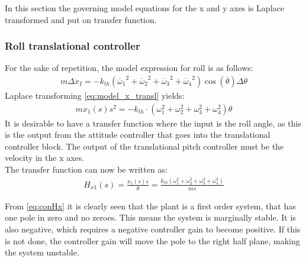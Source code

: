 In this section the governing model equations for the x and y axes is Laplace transformed and put on transfer function. 
\subsubsection*{Roll translational controller}
For the sake of repetition, the model expression for roll is as follows:
\begin{align}
m\Delta\ddot{x}_I = -k_{th}({\overline{\omega}_1}^2+{\overline{\omega}_2}^2+{\overline{\omega}_3}^2+{\overline{\omega}_4}^2)\cos(\overline{\theta})\Delta\theta
\label{eq:model_x_transl}
\end{align} 
Laplace transforming \autoref{eq:model_x_transl} yields:
\begin{align}
m x_1(s)s^2=-k_{th}\cdot (\omega_1 ^2 + \omega_2 ^2 + \omega_3 ^2 + \omega_4 ^2) \theta
\end{align}
It is desirable to have a transfer function where the input is the roll angle, as this is the output from the attitude controller that goes into the translational controller block. The output of the translational pitch controller must be the velocity in the x axes. \\
The transfer function can now be written as:
\begin{align}
H_{x1}(s)=\frac{x_1(s) s}{\theta}=\frac{k_{th} (\omega_1 ^2 + \omega_2 ^2 + \omega_3 ^2 + \omega_4 ^2)}{m s}\label{eq:conHx}
\end{align}
\begin{where}
\end{where}

From \autoref{eq:conHx} it is clearly seen that the plant is a first order system, that has one pole in zero and no zeroes. This means the system is marginally stable. It is also negative, which requires a negative controller gain to become positive. If this is not done, the controller gain will move the pole to the right half plane, making the system unstable. 

